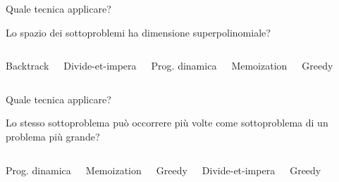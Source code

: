 \begin{frame}{Quale tecnica applicare?}

\vspace{-9pt}
\begin{myboxtitle}
Lo spazio dei sottoproblemi ha dimensione superpolinomiale?
\end{myboxtitle}

\vspace{-9pt}
\begin{columns}[T]

\BIL
\item Backtrack
\EIL

\BIL
\item Divide-et-impera
\item Prog. dinamica
\item Memoization
\item Greedy
\EIL

\end{columns}

\end{frame}


\begin{frame}{Quale tecnica applicare?}

\vspace{-9pt}
\begin{myboxtitle}[Ripetizioni]
Lo stesso sottoproblema può occorrere più volte come sottoproblema di un problema più grande?
\end{myboxtitle}

\vspace{-9pt}
\begin{columns}[T]
\BIL
\item Prog. dinamica
\item Memoization
\item Greedy
\EIL
{}
\BIL
\item Divide-et-impera
\item Greedy
\EIL
\end{columns}

\end{frame}


